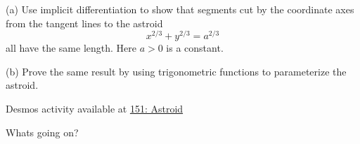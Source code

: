 \documentclass{ximera}
\begin{document}
\begin{question}  \label{Q:LLKKKMM}
(a) Use implicit differentiation to show that segments cut by the coordinate axes from the tangent lines to the astroid
\[
   x^{2/3} + y^{2/3} = a^{2/3}
\]
all have the same length. Here $a>0$ is a constant.

(b) Prove the same result by using trigonometric functions to parameterize the astroid.

\begin{onlineOnly}
    \begin{center}
\end{center}
\end{onlineOnly}

Desmos activity available at \href{https://www.desmos.com/calculator/vrythrvjuc}{151: Astroid}


\end{question}

Whats going on?
\end{document}
